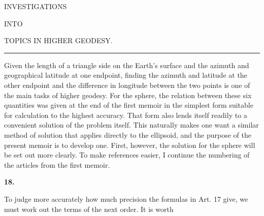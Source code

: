 \renewcommand{\Article}[1]{\par\medskip\Needspace{4\baselineskip}\pdfbookmark[1]{Art. #1}{geodaesie2-art-#1}\centerline{\textbf{#1.}}\nobreak\smallskip}
\begin{center}
INVESTIGATIONS\par\bigskip
INTO\par\bigskip
{\large TOPICS IN HIGHER GEODESY.}\par\medskip
\rule{.65in}{.3pt}
\end{center}
\noindent\hspace*{\parindent}Given the length of a triangle side on the Earth's surface and the azimuth and geographical latitude at one endpoint, finding the azimuth and latitude at the other endpoint and the difference in longitude between the two points is one of the main tasks of higher geodesy. For the sphere, the relation between these six quantities was given at the end of the first memoir in the simplest form suitable for calculation to the highest accuracy. That form also lends itself readily to a convenient solution of the problem itself. This naturally makes one want a similar method of solution that applies directly to the ellipsoid, and the purpose of the present memoir is to develop one. First, however, the solution for the sphere will be set out more clearly. To make references easier, I continue the numbering of the articles from the first memoir.

\Article{18}
To judge more accurately how much precision the formulas in Art. 17 give, we must work out the terms of the next order. It is worth
